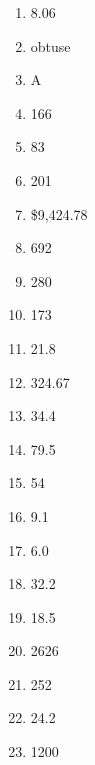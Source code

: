 \documentclass[../uilmath.tex]{subfiles}
\begin{document}
\begin{enumerate}[label=\bfseries\arabic*.]
    \item %
    8.06

    \item %
    obtuse 

    \item %
    A 

    \item %
    166

    \item %
    83

    \item %
    201

    \item %
    \$9,424.78

    \item %
    692

    \item %
    280

    \item %
    173

    \item %
    21.8

    \item %
    324.67

    \item %
    34.4

    \item %
    79.5 

    \item %
    54

    \item %
    9.1

    \item %
    6.0

    \item %
    32.2

    \item %
    18.5

    \item %
    2626

    \item %
    252

    \item %
    24.2

    \item %
    1200


\end{enumerate}
\end{document}

